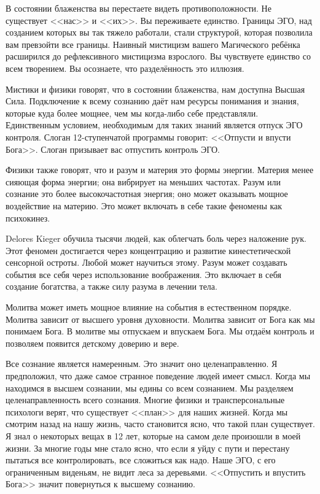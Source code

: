 \documentclass[10pt, fleqn]{article}
\begin{document}


В состоянии блаженства вы перестаете видеть противоположности. Не существует <<нас>> и <<их>>. Вы переживаете единство. Границы ЭГО, над созданием которых вы так тяжело работали, стали структурой, которая позволила вам превзойти все границы. Наивный мистицизм вашего Магического ребёнка расширился до рефлексивного мистицизма взрослого. Вы чувствуете единство со всем творением. Вы осознаете, что разделённость это иллюзия.



Мистики и физики говорят, что в состоянии блаженства, нам доступна Высшая Сила. Подключение к всему сознанию даёт нам ресурсы понимания и знания, которые куда более мощнее, чем мы когда-либо себе представляли. Единственным условием, необходимым для таких знаний является отпуск ЭГО контроля. Слоган 12-ступенчатой программы говорит: <<Отпусти и впусти Бога>>. Слоган призывает вас отпустить контроль ЭГО.



Физики также говорят, что и разум и материя это формы энергии. Материя менее сияющая форма энергии; она вибрирует на меньших частотах. Разум или сознание это более высокочастотная энергия; оно может оказывать мощное воздействие на материю. Это может включать в себе такие феномены как психокинез.

Delores Kieger обучила тысячи людей, как облегчать боль через наложение рук. Этот феномен достигается через концентрацию и развитие кинестетической сенсорной остроты. Любой может научиться этому. Разум может создавать события все себя через использование воображения. Это включает в себя создание богатства, а также силу разума в лечении тела.



Молитва может иметь мощное влияние на события в естественном порядке. Молитва зависит от высшего уровня духовности. Молитва зависит от Бога как мы понимаем Бога. В молитве мы отпускаем и впускаем Бога. Мы отдаём контроль и позволяем появится детскому доверию и вере.



Все сознание является намеренным. Это значит оно целенаправленно. Я предположил, что даже самое странное поведение людей имеет смысл. Когда мы находимся в высшем сознании, мы едины со всем сознанием. Мы разделяем целенаправленность всего сознания. Многие физики и трансперсональные психологи верят, что существует <<план>> для наших жизней. Когда мы смотрим назад на нашу жизнь, часто становится ясно, что такой план существует. Я знал о некоторых вещах в 12 лет, которые на самом деле произошли в моей жизни. За многие годы мне стало ясно, что если я уйду с пути и перестану пытаться все контролировать, все сложиться как надо. Наше ЭГО, с его ограниченным виденьям, не видит леса за деревьями. <<Отпустить и впустить Бога>> значит повернуться к высшему сознанию.
\end{document}
